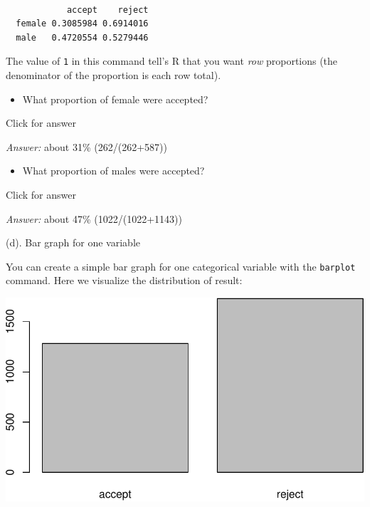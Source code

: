 \documentclass[
]{book}
\newenvironment{Shaded}{\begin{snugshade}}{\end{snugshade}}
\newcommand{\FunctionTok}[1]{\textcolor[rgb]{0.00,0.00,0.00}{#1}}
\newcommand{\NormalTok}[1]{#1}
\newcommand{\SpecialCharTok}[1]{\textcolor[rgb]{0.00,0.00,0.00}{#1}}
\providecommand{\tightlist}{%
  \setlength{\itemsep}{0pt}\setlength{\parskip}{0pt}}
\begin{document}
\begin{verbatim}
        
            accept    reject
  female 0.3085984 0.6914016
  male   0.4720554 0.5279446
\end{verbatim}

The value of \texttt{1} in this command tell's R that you want \emph{row} proportions (the denominator of the proportion is each row total).

\begin{itemize}
\tightlist
\item
  What proportion of female were accepted?
\end{itemize}

Click for answer

\emph{Answer:} about 31\% (262/(262+587))

\begin{itemize}
\tightlist
\item
  What proportion of males were accepted?
\end{itemize}

Click for answer

\emph{Answer:} about 47\% (1022/(1022+1143))

(d). Bar graph for one variable

You can create a simple bar graph for one categorical variable with the \texttt{barplot} command. Here we visualize the distribution of result:

\begin{Shaded}
\end{Shaded}

\includegraphics[width=1\linewidth]{Class_Activity_4_files/figure-latex/unnamed-chunk-23-1}
\end{document}

